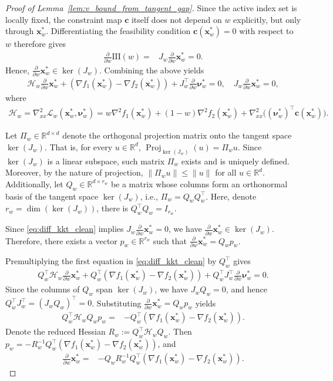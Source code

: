 \documentclass{article}
\newcommand{\bx}{\mathbf{x}}
\newcommand{\Proj}{\operatorname{Proj}}
\begin{document}
\begin{proof}[Proof of Lemma~\ref{lem:v_bound_from_tangent_gap}]
Since the active index set is locally fixed, the constraint map $\mathbf c$ itself does not depend on $w$ explicitly, but only through $\bx_w^*$. Differentiating the feasibility condition $\mathbf c(\bx_w^*)=0$ with respect to $w$ therefore gives
\begin{align}
\frac{\partial}{\partial w}\mathrm{III}(w)
= & J_w \frac{\partial}{\partial w}\bx_w^*
= 0.
\end{align}
Hence, $\frac{\partial}{\partial w}\bx_w^* \in \ker(J_w)$. Combining the above yields
\begin{align}
\mathcal H_w \frac{\partial}{\partial w}\bx_w^*+(\nabla f_1(\bx_w^*)-\nabla f_2(\bx_w^*))+J_w^\top \frac{\partial}{\partial w}\boldsymbol{\nu}_w^*=0,\quad J_w \frac{\partial}{\partial w}\bx_w^*=0,
\label{eq:diff_kkt_clean}
\end{align}
where
\begin{align}
\mathcal H_w = \nabla_{xx}^2 \mathcal L_w(\bx_w^*,\boldsymbol{\nu}_w^*)
= w\nabla^2 f_1(\bx_w^*)+(1-w)\nabla^2 f_2(\bx_w^*)+\nabla_{xx}^2\big((\boldsymbol{\nu}_w^*)^\top \mathbf c(\bx_w^*)\big) .
\end{align}

Let $\Pi_w\in\mathbb R^{d\times d}$ denote the orthogonal projection matrix onto the tangent space $\ker(J_w)$. That is, for every $u\in\mathbb R^d$, $\Proj_{\ker(J_w)}(u)=\Pi_w u$. Since $\ker(J_w)$ is a linear subspace, such matrix $\Pi_w$ exists and is uniquely defined. Moreover, by the nature of projection, $\|\Pi_w u\| \le \|u\|$ for all $u\in\mathbb{R}^d$. Additionally, let $Q_w\in\mathbb R^{d\times r_w}$ be a matrix whose columns form an orthonormal basis of the tangent space $\ker(J_w)$, i.e., $\Pi_w = Q_w Q_w^\top$. Here, denote $r_w=\dim(\ker(J_w))$, there is $Q_w^\top Q_w = I_{r_w}$.

Since \eqref{eq:diff_kkt_clean} implies $J_w \frac{\partial}{\partial w}\bx_w^* = 0$, we have $\frac{\partial}{\partial w}\bx_w^* \in \ker(J_w)$. Therefore, there exists a vector $p_w\in\mathbb R^{r_w}$ such that $\frac{\partial}{\partial w}\bx_w^* = Q_w p_w$.

Premultiplying the first equation in \eqref{eq:diff_kkt_clean} by $Q_w^\top$ gives
\begin{align}
Q_w^\top \mathcal H_w \frac{\partial}{\partial w}\bx_w^*+Q_w^\top (\nabla f_1(\bx_w^*)-\nabla f_2(\bx_w^*))+Q_w^\top J_w^\top \frac{\partial}{\partial w}\boldsymbol{\nu}_w^*=0.
\end{align}
Since the columns of $Q_w$ span $\ker(J_w)$, we have $J_w Q_w = 0$, and hence $Q_w^\top J_w^\top = (J_w Q_w)^\top = 0$. Substituting $\frac{\partial}{\partial w}\bx_w^* = Q_w p_w$ yields
\begin{align}
Q_w^\top \mathcal H_w Q_w p_w
= & -Q_w^\top (\nabla f_1(\bx_w^*)-\nabla f_2(\bx_w^*)).
\end{align}
Denote the reduced Hessian $R_w := Q_w^\top \mathcal H_w Q_w$. Then $p_w = - R_w^{-1} Q_w^\top (\nabla f_1(\bx_w^*)-\nabla f_2(\bx_w^*))$, and
\begin{align}
\frac{\partial}{\partial w}\bx_w^*
= & -Q_w R_w^{-1} Q_w^\top (\nabla f_1(\bx_w^*)-\nabla f_2(\bx_w^*)).
\end{align}


\end{proof}
\end{document}
